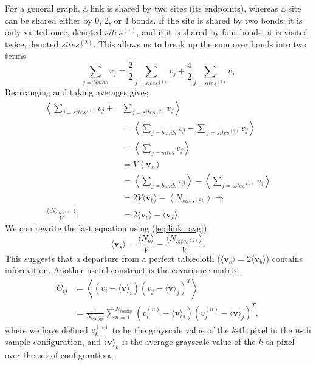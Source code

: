 \documentclass[../main.tex]{subfiles}
\begin{document}
For a general graph, a link is shared by two sites (its endpoints), whereas a site can be shared either by 0, 2, or 4
bonds. If the site is shared by two bonds, it is only visited once, denoted $sites^{(1)}$, and if it is shared by four
bonds, it is visited twice, denoted $sites^{(2)}$. This allows us to break up the sum over bonds into two terms
\begin{equation}
    \sum_{j=bonds} v_j = \frac{2}{2}\sum_{j=sites^{(1)}} v_j
        + \frac{4}{2} \sum_{j=sites^{(2)}} v_j
\end{equation}
Rearranging and taking averages gives
\begin{align}
    \left\langle \sum_{j=sites^{(1)}} v_j \right. 
    + &\left. \sum_{j=sites^{(2)}} v_j \right\rangle\\
    &=\left\langle \sum_{j=bonds} v_j - \sum_{j=sites^{(2)}} v_j \right\rangle\\
    &= \left\langle \sum_{j=sites} v_j\right\rangle\\
    &= V\left\langle \mathbf{v}_s\right\rangle\\
    & = \left\langle \sum_{j=bonds} v_j \right\rangle - \left\langle
        \sum_{j=sites^{(2)}} v_j \right\rangle\\
    &= 2V \langle\mathbf{v}_b\rangle - \left\langle
        N_{sites^{(2)}}\right\rangle\Longrightarrow\\
    \frac{\left\langle N_{sites^{(2)}}\right\rangle}{V} &=
        2\langle\mathbf{v}_b\rangle - \langle \mathbf{v}_s\rangle.
\end{align}
We can rewrite the last equation using (\ref{eq:link_avg})
\begin{equation}
    \langle \mathbf{v}_s \rangle= \frac{\langle N_b\rangle}{V} - \frac{\langle
        N_{sites^{(2)}}\rangle}{V}.
\end{equation}
This suggests that a departure from a perfect tablecloth ($\langle \mathbf{v}_s\rangle = 2\langle \mathbf{v}_b\rangle$)
contains information.  Another useful construct is the covariance matrix,
%
\begin{align}
    C_{ij} &=
    \left\langle\left(v_i -\langle \mathbf{v}\rangle_i\right)
    \left(v_j -\langle \mathbf{v}\rangle_j\right)^{T}\right\rangle\\
        &= \frac{1}{N_{\mathrm{configs}}}\sum_{n=1}^{N_{\mathrm{configs}}}
        \left(v_i^{(n)} -\langle \mathbf{v}\rangle_i\right)
        \left(v_j^{(n)} -\langle \mathbf{v}\rangle_j\right)^{T},
    \label{covariance_matrix}
\end{align}
where we have defined $v_k^{(n)}$ to be the grayscale value of the $k$-th pixel in the $n$-th sample configuration, and
$\langle \mathbf{v}\rangle_k$ is the average grayscale value of the $k$-th pixel over the set of configurations.
\end{document}
